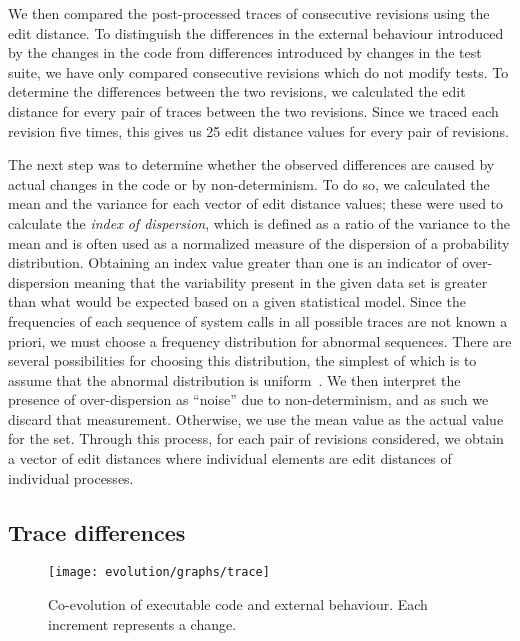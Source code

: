 We then compared the post-processed traces of consecutive revisions using the
edit distance. To distinguish the differences in the external behaviour
introduced by the changes in the code from differences introduced by changes in
the test suite, we have only compared consecutive revisions which do not modify
tests. To determine the differences between the two revisions, we calculated
the edit distance for every pair of traces between the two revisions. Since we
traced each revision five times, this gives us 25 edit distance values
for every pair of revisions.

The next step was to determine whether the observed differences are caused by
actual changes in the code or by non-determinism. To do so, we calculated the
mean and the variance for each vector of edit distance values; these were used
to calculate the \emph{index of dispersion}, which is defined as a ratio of the
variance to the mean and is often used as a normalized measure of the
dispersion of a probability distribution. Obtaining an index value greater than
one is an indicator of over-dispersion meaning that the variability present in
the given data set is greater than what would be expected based on a given
statistical model. Since the frequencies of each sequence of system calls in
all possible traces are not known a priori, we must choose a frequency
distribution for abnormal sequences. There are several possibilities for
choosing this distribution, the simplest of which is to assume that the
abnormal distribution is uniform~\cite{helman97}. We then interpret the
presence of over-dispersion as ``noise'' due to non-determinism, and as such we
discard that measurement. Otherwise, we use the mean value as the actual value
for the set. Through this process, for each pair of revisions considered, we
obtain a vector of edit distances where individual elements are edit distances
of individual processes.

\subsection{Trace differences}

\begin{figure}[t]
  \begin{center}
    \texttt{[image: evolution/graphs/trace]}
    \caption{Co-evolution of executable code and external behaviour. Each
    increment represents a change.}
    \label{fig:coexternal}
  \end{center}
\end{figure}

